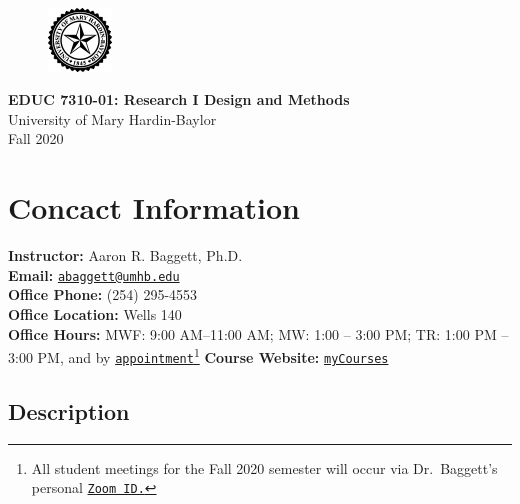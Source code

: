 \documentclass[
]{article}
\author{}
\date{\vspace{-2.5em}}
\begin{document}
\makeatletter
\setlength{\@fptop}{0pt}
\makeatother

\begin{figure}[t!]
  \centering
  \includegraphics[keepaspectratio, width=0.15\textwidth]{./Figs/Seal-Black}
\end{figure}


\begin{center}
{\LARGE{\bf{EDUC 7310-01: Research I Design and Methods}}}\\
{\small{University of Mary Hardin-Baylor}}\\
\vspace{.15in}
{\large{Fall 2020}}
\end{center}

\thispagestyle{empty}

\vspace{3mm}

\vspace{.25in}

\section{Concact Information}

\textbf{Instructor:} Aaron R. Baggett, Ph.D.\\
\textbf{Email:}
\texttt{\href{mailto:abaggett@umhb.edu}{abaggett@umhb.edu}}\\
\textbf{Office Phone:} (254) 295-4553\\
\textbf{Office Location:} Wells 140\\
\textbf{Office Hours:} MWF: 9:00 AM--11:00 AM; MW: 1:00 -- 3:00 PM; TR:
1:00 PM -- 3:00 PM, and by
\texttt{\href{mailto:abaggett@umhb.edu}{appointment}}\footnote{All
  student meetings for the Fall 2020 semester will occur via
  Dr.~Baggett's personal
  \texttt{\href{https://umhb.zoom.us/j/5393191651}{Zoom ID.}}}
\textbf{Course Website:}
\texttt{\href{https://mycourses.umhb.edu/courses/23592}{myCourses}}

\subsection{Description}
\end{document}

